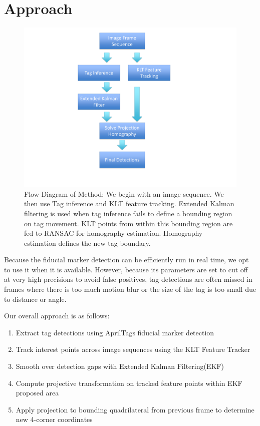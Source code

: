 \documentclass[12pt]{article}
\begin{document}
\section{Approach}
\label{sec:approach}
\begin{figure}
\centering
\includegraphics[scale=.15]{flowchart.pdf}
\caption{Flow Diagram of Method: We begin with an image sequence. We then use Tag inference and KLT feature tracking. Extended Kalman filtering is used when tag inference fails to define a bounding region on tag movement. KLT points from within this bounding region are fed to RANSAC for homography estimation. Homography estimation defines the new tag boundary.}
\end{figure}

Because the fiducial marker detection can be efficiently run in real time, we opt to use it when it is available. However, because its parameters are set to cut off at very high precisions to avoid false positives, tag detections are often missed in frames where there is too much motion blur or the size of the tag is too small due to distance or angle.

Our overall approach is as follows:
\begin{enumerate}
\item Extract tag detections using AprilTags fiducial marker detection \cite{Olson2011}
\item Track interest points across image sequences using the KLT Feature Tracker \cite{Lucas1981,Shi1994,Tomasi1991}
\item Smooth over detection gaps with Extended Kalman Filtering(EKF) \cite{Thrun2005}
\item Compute projective transformation on tracked feature points within EKF proposed area \cite{Forsyth2002}
\item Apply projection to bounding quadrilateral from previous frame to determine new 4-corner coordinates
\end{enumerate}
\end{document}
